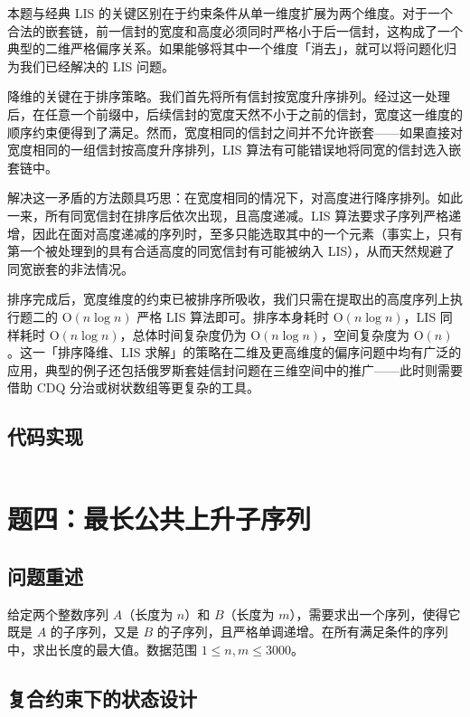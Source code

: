 \documentclass[12pt, a4paper]{academics}
\begin{document}
本题与经典 LIS 的关键区别在于约束条件从单一维度扩展为两个维度。对于一个合法的嵌套链，前一信封的宽度和高度必须同时严格小于后一信封，这构成了一个典型的二维严格偏序关系。如果能够将其中一个维度「消去」，就可以将问题化归为我们已经解决的 LIS 问题。

降维的关键在于排序策略。我们首先将所有信封按宽度升序排列。经过这一处理后，在任意一个前缀中，后续信封的宽度天然不小于之前的信封，宽度这一维度的顺序约束便得到了满足。然而，宽度相同的信封之间并不允许嵌套——如果直接对宽度相同的一组信封按高度升序排列，LIS 算法有可能错误地将同宽的信封选入嵌套链中。

解决这一矛盾的方法颇具巧思：在宽度相同的情况下，对高度进行降序排列。如此一来，所有同宽信封在排序后依次出现，且高度递减。LIS 算法要求子序列严格递增，因此在面对高度递减的序列时，至多只能选取其中的一个元素（事实上，只有第一个被处理到的具有合适高度的同宽信封有可能被纳入 LIS），从而天然规避了同宽嵌套的非法情况。

排序完成后，宽度维度的约束已被排序所吸收，我们只需在提取出的高度序列上执行题二的 $\mathrm{O}(n \log n)$ 严格 LIS 算法即可。排序本身耗时 $\mathrm{O}(n \log n)$，LIS 同样耗时 $\mathrm{O}(n \log n)$，总体时间复杂度仍为 $\mathrm{O}(n \log n)$，空间复杂度为 $\mathrm{O}(n)$。这一「排序降维、LIS 求解」的策略在二维及更高维度的偏序问题中均有广泛的应用，典型的例子还包括俄罗斯套娃信封问题在三维空间中的推广——此时则需要借助 CDQ 分治或树状数组等更复杂的工具。

\subsection{代码实现}

\inputminted{c++}{../src/p3_envelopes.cpp}

\section{题四：最长公共上升子序列}

\subsection{问题重述}

给定两个整数序列 $A$（长度为 $n$）和 $B$（长度为 $m$），需要求出一个序列，使得它既是 $A$ 的子序列，又是 $B$ 的子序列，且严格单调递增。在所有满足条件的序列中，求出长度的最大值。数据范围 $1 \le n, m \le 3000$。

\subsection{复合约束下的状态设计}
\end{document}
